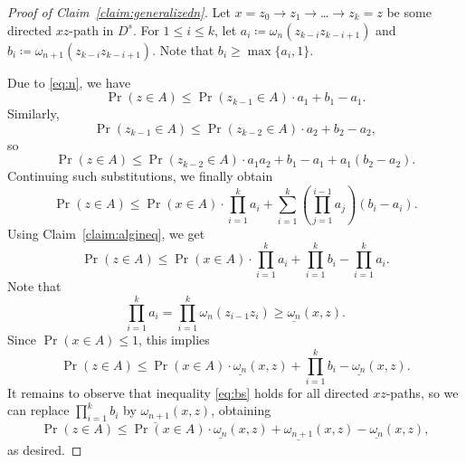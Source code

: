 \documentclass[10pt]{article}
\numberwithin{equation}{subsection}
\theoremstyle{definition}
\begin{document}
	\begin{proof}[Proof of Claim~\ref{claim:generalizedn}]
		Let $x = z_0\longrightarrow z_1\longrightarrow$\ldots$\longrightarrow z_k = z$ be some directed $xz$-path in $D^s$. For $1 \leq i \leq k$, let $a_i \coloneqq \omega_n(z_{k-i} z_{k-i+1})$ and $b_i \coloneqq \omega_{n+1}(z_{k-i} z_{k-i+1})$. Note that $b_i \geq \max\{a_i, 1\}$.
		
		Due to \eqref{eq:n}, we have
		$$
		\Pr(z \in A) \leq \Pr(z_{k-1} \in A) \cdot a_1 + b_1 - a_1.
		$$
		Similarly,
		$$
		\Pr(z_{k-1} \in A) \leq \Pr(z_{k-2} \in A) \cdot a_2 + b_2 - a_2,
		$$
		so
		$$
		\Pr(z \in A) \leq \Pr(z_{k-2} \in A) \cdot a_1 a_2 + b_1 - a_1 + a_1(b_2-a_2).
		$$
		Continuing such substitutions, we finally obtain
		$$
		\Pr(z \in A) \leq \Pr(x \in A) \cdot \prod_{i = 1}^k a_i + \sum_{i=1}^{k} \left(\prod_{j=1}^{i-1}a_j\right)(b_i - a_i).
		$$
		Using Claim~\ref{claim:algineq}, we get
		$$
		\Pr(z \in A) \leq \Pr(x \in A) \cdot \prod_{i = 1}^k a_i + \prod_{i = 1}^k b_i - \prod_{i=1}^k a_i.
		$$
		Note that
		$$
		\prod_{i=1}^k a_i = \prod_{i=1}^k \omega_n(z_{i-1}z_i) \geq \underline{\omega_n}(x,z).
		$$
		Since $\Pr(x \in A) \leq 1$, this implies
		\begin{equation}\label{eq:bs}
		\Pr(z \in A) \leq \Pr(x \in A) \cdot \underline{\omega_n}(x,z) + \prod_{i = 1}^k b_i - \underline{\omega_n}(x,z).
		\end{equation}
		It remains to observe that inequality \eqref{eq:bs} holds for all directed $xz$-paths, so we can replace $\prod_{i = 1}^k b_i$ by $\underline{\omega_{n+1}}(x,z)$, obtaining
		$$
		\Pr(z \in A) \leq \Pr(x \in A) \cdot \underline{\omega_n}(x,z) + \underline{\omega_{n+1}}(x,z)-\underline{\omega_n}(x,z),
		$$
		as desired.
	\end{proof}
	
\end{document}
